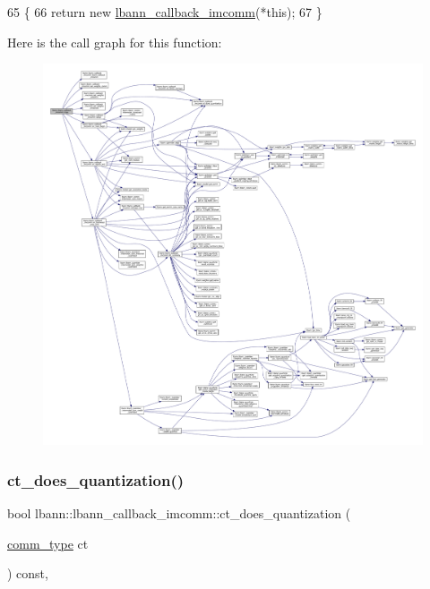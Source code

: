 \begin{DoxyCode}
65                                                \{
66     \textcolor{keywordflow}{return} \textcolor{keyword}{new} \hyperlink{classlbann_1_1lbann__callback__imcomm_a06dc9efdcd77c9e1cf714ecf709a6e3a}{lbann\_callback\_imcomm}(*\textcolor{keyword}{this});
67   \}
\end{DoxyCode}
Here is the call graph for this function\+:\nopagebreak
\begin{figure}[H]
\begin{center}
\leavevmode
\includegraphics[width=350pt]{classlbann_1_1lbann__callback__imcomm_a9d59535b4789389a8c3c9e406cd1e2d3_cgraph}
\end{center}
\end{figure}
\mbox{\label{classlbann_1_1lbann__callback__imcomm_a8b29853e49c58cf737a741c503737705}} 
\subsubsection{\texorpdfstring{ct\+\_\+does\+\_\+quantization()}{ct\_does\_quantization()}}
{\footnotesize\ttfamily bool lbann\+::lbann\+\_\+callback\+\_\+imcomm\+::ct\+\_\+does\+\_\+quantization (\begin{DoxyParamCaption}\item[{\hyperlink{classlbann_1_1lbann__callback__imcomm_acf7e894b3381e7f9b71020dc73594d6a}{comm\+\_\+type}}]{ct }\end{DoxyParamCaption}) const\hspace{0.3cm}{\ttfamily [inline]}, {\ttfamily [private]}}

